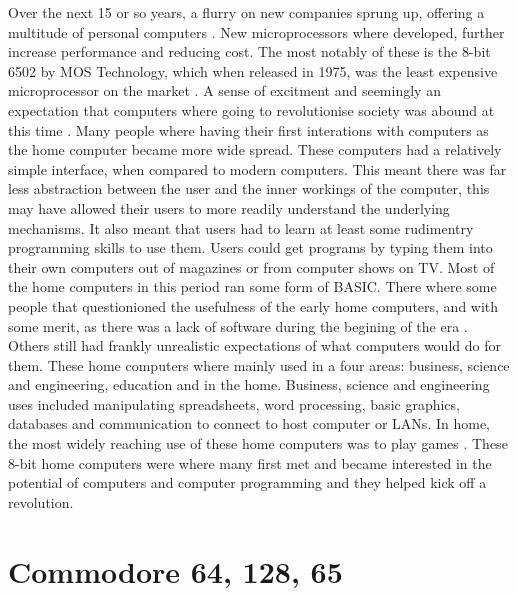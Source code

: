 Over the next 15 or so years, a flurry on new companies sprung up, offering a multitude of personal computers \cite{Micro}. New microprocessors where developed, further increase performance and reducing cost. The most notably of these is the 8-bit 6502 by MOS Technology, which when released in 1975, was the least expensive microprocessor on the market \cite{EET75}. A sense of excitment and seemingly an expectation that computers where going to revolutionise society was abound at this time \cite{Cass14}. Many people where having their first interations with computers as the home computer became more wide spread. These computers had a relatively simple interface, when compared to modern computers. This meant there was far less abstraction between the user and the inner workings of the computer, this may have allowed their users to more readily understand the underlying mechanisms. It also meant that users had to learn at least some rudimentry programming skills to use them. Users could get programs by typing them into their own computers out of magazines or from computer shows on TV. Most of the home computers in this period ran some form of BASIC. There where some people that questionioned the usefulness of the early home computers, and with some merit, as there was a lack of software during the begining of the era \cite{Swalwell12}. Others still had frankly unrealistic expectations of what computers would do for them. These home computers where mainly used in a four areas: business, science and engineering, education and in the home. Business, science and engineering uses included manipulating spreadsheets, word processing, basic graphics, databases and communication to connect to host computer or LANs. In home, the most widely reaching use of these home computers was to play games \cite{Gupta84}. These 8-bit home computers were where many first met and became interested in the potential of computers and computer programming and they helped kick off a revolution.


\section{Commodore 64, 128, 65}
